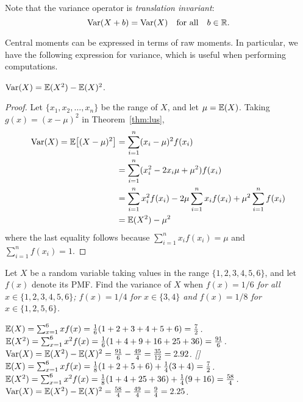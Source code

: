 \begin{remark}
Note that the variance operator is \emph{translation invariant}: 
\[
\text{Var}(X+b)=\text{Var}(X)\quad\text{for all}\quad b\in\mathbb{R}.
\]
\end{remark}

Central moments can be expressed in terms of raw moments. In particular, we have the following expression for variance, which is useful when performing computations.
\begin{lemma}
$\text{Var}(X) = \mathbb{E}(X^2) - \mathbb{E}(X)^2$.
\end{lemma}

\begin{proof}
Let $\{x_1,x_2,\ldots,x_n\}$ be the range of $X$, and let $\mu=\mathbb{E}(X)$. Taking $g(x) = (x-\mu)^2$ in Theorem~\ref{thm:lus},
\begin{align*}
\text{Var}(X) = \mathbb{E}\big[(X-\mu)^2\big]
	& = \sum_{i=1}^n (x_i-\mu)^2 f(x_i) \\
	& = \sum_{i=1}^n (x_i^2 - 2x_i\mu + \mu^2) f(x_i) \\
	& = \sum_{i=1}^n x_i^2 f(x_i) - 2\mu\sum_{i=1}^n x_i f(x_i) + \mu^2\sum_{i=1}^n f(x_i) \\
	& = \mathbb{E}(X^2) - \mu^2
\end{align*}
where the last equality follows because $\sum_{i=1}^n x_i f(x_i)=\mu$ and $\sum_{i=1}^n f(x_i) = 1$.
\end{proof}

\begin{example}
Let $X$ be a random variable taking values in the range $\{1,2,3,4,5,6\}$, and let $f(x)$ denote its PMF. Find the variance of $X$ when
\ben
\it $f(x) = 1/6$ for all $x\in\{1,2,3,4,5,6\}$;
\it $f(x) = 1/4$ for $x\in\{3,4\}$ and $f(x) = 1/8$ for $x\in\{1,2,5,6\}$.
\een
\end{example}

\begin{solution}
\bit
\it $\mathbb{E}(X) 	= \sum_{x=1}^6 x f(x)	= \frac{1}{6}(1+2+3+4+5+6)		= \frac{7}{2}$.
\it $\mathbb{E}(X^2) 	= \sum_{x=1}^6 x^2 f(x)	= \frac{1}{6}(1+4+9+16+25+36) 	= \frac{91}{6}$.
\it $\text{Var}(X)		= \mathbb{E}(X^2)-\mathbb{E}(X)^2	= \frac{91}{6}-\frac{49}{4}		= \frac{35}{12} = 2.92$.
\it[] 
\it $\mathbb{E}(X)	= \sum_{x=1}^6 x f(x) 	= \frac{1}{8}(1+2+5+6) + \frac{1}{4}(3+4) = \frac{7}{2}$.
\it $\mathbb{E}(X^2)	= \sum_{x=1}^6 x^2 f(x) = \frac{1}{8}(1+4+25+36) + \frac{1}{4}(9+16) = \frac{58}{4}$.
\it $\text{Var}(X)		= \mathbb{E}(X^2)-\mathbb{E}(X)^2	= \frac{58}{4} - \frac{49}{4} = \frac{9}{4} = 2.25$.
\eit
\end{solution}

